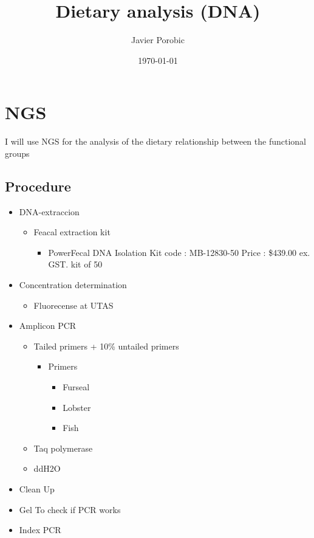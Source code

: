 \documentclass[11pt]{article}
\title{Dietary analysis (DNA)}
\author{Javier Porobic}
\date{\today}
\begin{document}
\maketitle

\section*{NGS}
\label{sec-1}

      I will use NGS for the analysis of the dietary relationship between the functional groups
\subsection*{Procedure}
\label{sec-1-1}

\begin{itemize}
\item DNA-extraccion
\begin{itemize}
\item Feacal extraction kit
\begin{itemize}
\item PowerFecal DNA Isolation Kit code : MB-12830-50
       Price : \$439.00 ex. GST. kit of 50
\end{itemize}
\end{itemize}
\item Concentration determination
\begin{itemize}
\item Fluorecense at UTAS
\end{itemize}
\item Amplicon PCR
\begin{itemize}
\item Tailed primers  + 10\% untailed primers
\begin{itemize}
\item Primers
\begin{itemize}
\item Furseal
\item Lobster
\item Fish
\end{itemize}
\end{itemize}
\item Taq polymerase
\item ddH2O
\end{itemize}
\item Clean Up
\item Gel
   To check if PCR works
\item Index PCR
\begin{itemize}

\end{itemize}
\end{itemize}
\end{document}
